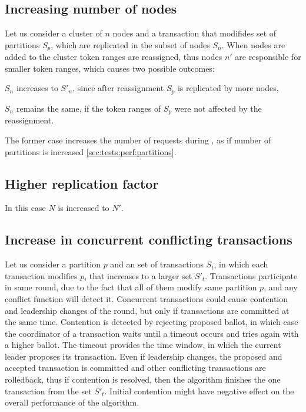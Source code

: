 \subsection{Increasing number of nodes}
Let us consider a cluster of $n$ nodes and a transaction that modifides set of partitions $S_{p}$, which are replicated in the subset of nodes $S_{n}$.
When nodes are added to the cluster token ranges are reassigned, thus nodes $n'$ are responsible for smaller token ranges, which causes two possible outcomes:
\begin{enumerate*}
\item $S_{n}$ increases to $S'_{n}$, since after reassignment $S_{p}$ is replicated by more nodes,
\item $S_{n}$ remains the same, if the token ranges of $S_{p}$ were not affected by the reassignment.
\end{enumerate*}

The former case increases the number of requests during \mpt, as if number of partitions is increased \ref{sec:tests:perf:partitions}.

\subsection{Higher replication factor}
In this case $N$ is increased to $N'$.

\subsection{Increase in concurrent conflicting transactions}
Let us consider a partition $p$ and an set of transactions $S_{t}$, in which each transaction modifies $p$, that increases to a larger set $S'_{t}$. 
Transactions participate in same \paxos round, due to the fact that all of them modify same partition $p$, and any conflict function \label{sec:theory:conflictFunctions} will detect it.
Concurrent transactions could cause contention and leadership changes of the \paxos round, but only if transactions are committed at the same time. Contention is detected by rejecting proposed ballot, in which case the coordinator of a transaction waits until a timeout occurs and tries again with a higher ballot. The timeout provides the time window, in which the current leader proposes its transaction. Even if leadership changes, the proposed and accepted transaction is committed and other conflicting transactions are rolledback, thus if contention is resolved, then the algorithm finishes the one transaction from the set $S'_{t}$. Initial contention might have negative effect on the overall performance of the algorithm.

